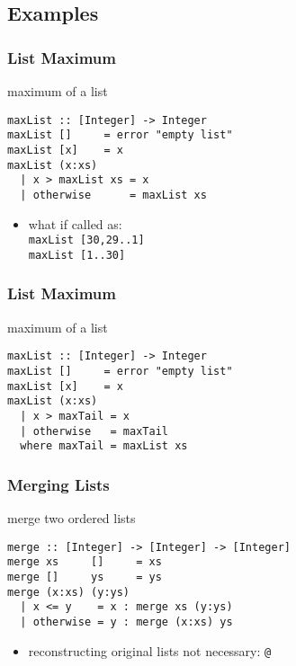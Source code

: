 \documentclass[dvipsnames]{beamer}
\theoremstyle{plain}
\begin{document}

\subsection{Examples}

\begin{frame}[fragile]
  \frametitle{List Maximum}

  \begin{exampleblock}{maximum of a list}
    \begin{lstlisting}
maxList :: [Integer] -> Integer
maxList []     = error "empty list"
maxList [x]    = x
maxList (x:xs)
  | x > maxList xs = x
  | otherwise      = maxList xs
    \end{lstlisting}
  \end{exampleblock}

  \pause
  \begin{itemize}
    \item what if called as:\\
      \lstinline{maxList [30,29..1]}\\
      \lstinline{maxList [1..30]}
  \end{itemize}
\end{frame}

\begin{frame}[fragile]
  \frametitle{List Maximum}

  \begin{exampleblock}{maximum of a list}
    \begin{lstlisting}
maxList :: [Integer] -> Integer
maxList []     = error "empty list"
maxList [x]    = x
maxList (x:xs)
  | x > maxTail = x
  | otherwise   = maxTail
  where maxTail = maxList xs
    \end{lstlisting}
  \end{exampleblock}
\end{frame}

\begin{frame}[fragile]
  \frametitle{Merging Lists}

  \begin{exampleblock}{merge two ordered lists}
    \begin{lstlisting}
merge :: [Integer] -> [Integer] -> [Integer]
merge xs     []     = xs
merge []     ys     = ys
merge (x:xs) (y:ys)
  | x <= y    = x : merge xs (y:ys)
  | otherwise = y : merge (x:xs) ys
    \end{lstlisting}
  \end{exampleblock}

  \begin{itemize}
    \item reconstructing original lists not necessary: \lstinline{@}
  \end{itemize}
\end{frame}
\end{document}
